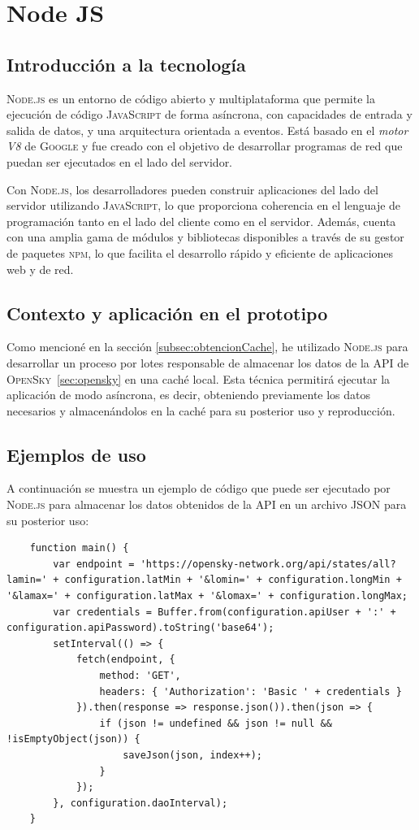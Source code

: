 \documentclass[a4paper, 11pt]{book}
\begin{document}
\section{Node JS}
\subsection{Introducción a la tecnología}
\textsc{Node.js} es un entorno de código abierto y multiplataforma que permite la ejecución de código \textsc{JavaScript} de forma asíncrona, con capacidades de entrada y salida de datos, y una arquitectura orientada a eventos. Está basado en el \emph{motor V8} de \textsc{Google} y fue creado con el objetivo de desarrollar programas de red que puedan ser ejecutados en el lado del servidor.

Con \textsc{Node.js}, los desarrolladores pueden construir aplicaciones del lado del servidor utilizando \textsc{JavaScript}, lo que proporciona coherencia en el lenguaje de programación tanto en el lado del cliente como en el servidor. Además, cuenta con una amplia gama de módulos y bibliotecas disponibles a través de su gestor de paquetes \textsc{\gls{npm}}, lo que facilita el desarrollo rápido y eficiente de aplicaciones web y de red.
\subsection{Contexto y aplicación en el prototipo}
Como mencioné en la sección \ref{subsec:obtencionCache}, he utilizado \textsc{Node.js} para desarrollar un proceso por lotes responsable de almacenar los datos de la \textsc{API} de \textsc{OpenSky}~\ref{sec:opensky} en una caché local. Esta técnica permitirá ejecutar la aplicación de modo asíncrona, es decir, obteniendo previamente los datos necesarios y almacenándolos en la caché para su posterior uso y reproducción.
\subsection{Ejemplos de uso}
A continuación se muestra un ejemplo de código que puede ser ejecutado por \textsc{Node.js} para almacenar los datos obtenidos de la \textsc{API} en un archivo \textsc{\gls{JSON}} para su posterior uso:
\begin{verbatim}
	function main() {
		var endpoint = 'https://opensky-network.org/api/states/all?lamin=' + configuration.latMin + '&lomin=' + configuration.longMin + '&lamax=' + configuration.latMax + '&lomax=' + configuration.longMax;
		var credentials = Buffer.from(configuration.apiUser + ':' + configuration.apiPassword).toString('base64');
		setInterval(() => {
			fetch(endpoint, {
				method: 'GET',
				headers: { 'Authorization': 'Basic ' + credentials }
			}).then(response => response.json()).then(json => {
				if (json != undefined && json != null && !isEmptyObject(json)) {
					saveJson(json, index++);
				}
			});
		}, configuration.daoInterval);
	}
\end{verbatim}
\label{sec:nodejs}
\end{document}
